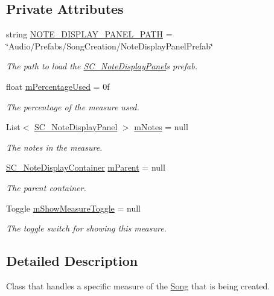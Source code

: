 \subsection*{Private Attributes}
\begin{DoxyCompactItemize}
\item 
string \hyperlink{group___s_c___m_d_p_const_ga6eee69b23fe2146403f41e4e862a3df9}{N\+O\+T\+E\+\_\+\+D\+I\+S\+P\+L\+A\+Y\+\_\+\+P\+A\+N\+E\+L\+\_\+\+P\+A\+TH} = \char`\"{}Audio/Prefabs/Song\+Creation/Note\+Display\+Panel\+Prefab\char`\"{}
\begin{DoxyCompactList}\small\item\em The path to load the \hyperlink{group___doc_s_c___n_d_p}{S\+C\+\_\+\+Note\+Display\+Panel}\textquotesingle{}s prefab. \end{DoxyCompactList}\item 
float \hyperlink{group___s_c___m_d_p_priv_var_ga7567e9001016a06d950b9d0cc9e1d905}{m\+Percentage\+Used} = 0f
\begin{DoxyCompactList}\small\item\em The percentage of the measure used. \end{DoxyCompactList}\item 
List$<$ \hyperlink{class_s_c___note_display_panel}{S\+C\+\_\+\+Note\+Display\+Panel} $>$ \hyperlink{group___s_c___m_d_p_priv_var_gaf8a533bce87e58d8f7a1da88f476ac6f}{m\+Notes} = null
\begin{DoxyCompactList}\small\item\em The notes in the measure. \end{DoxyCompactList}\item 
\hyperlink{class_s_c___note_display_container}{S\+C\+\_\+\+Note\+Display\+Container} \hyperlink{group___s_c___m_d_p_priv_var_ga6f22ae359dd68605a8b2fd961ced96b5}{m\+Parent} = null
\begin{DoxyCompactList}\small\item\em The parent container. \end{DoxyCompactList}\item 
Toggle \hyperlink{group___s_c___m_d_p_priv_var_gabec551ab0b79d269b028f4bc99e82b00}{m\+Show\+Measure\+Toggle} = null
\begin{DoxyCompactList}\small\item\em The toggle switch for showing this measure. \end{DoxyCompactList}\end{DoxyCompactItemize}


\subsection{Detailed Description}
Class that handles a specific measure of the \hyperlink{class_song}{Song} that is being created. 

